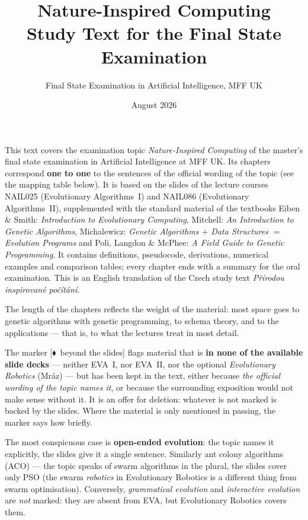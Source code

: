 \documentclass[11pt,a4paper]{article}
\title{\textbf{Nature-Inspired Computing}\\[2mm]
\large Study Text for the Final State Examination}
\author{Final State Examination in Artificial Intelligence, MFF UK}
\date{August 2026}
\theoremstyle{definition}
\newcommand{\mimo}{\textcolor{markcol}{\textsf{\footnotesize[$\blacklozenge$~beyond the slides]}}}
\begin{document}
\maketitle

\begin{center}
\begin{minipage}{0.92\textwidth}
\small
This text covers the examination topic \emph{Nature-Inspired Computing} of the master's final
state examination in Artificial Intelligence at MFF UK. Its chapters correspond
\textbf{one to one} to the sentences of the official wording of the topic (see the mapping
table below). It is based on the slides of the lecture courses NAIL025 (Evolutionary
Algorithms~I) and NAIL086 (Evolutionary Algorithms~II), supplemented with the standard
material of the textbooks Eiben \& Smith: \emph{Introduction to Evolutionary Computing},
Mitchell: \emph{An Introduction to Genetic Algorithms}, Michalewicz: \emph{Genetic Algorithms
$+$ Data Structures $=$ Evolution Programs} and Poli, Langdon \& McPhee: \emph{A Field Guide
to Genetic Programming}. It contains definitions, pseudocode, derivations, numerical examples
and comparison tables; every chapter ends with a summary for the oral examination.
This is an English translation of the Czech study text \emph{Přírodou inspirované počítání}.
\end{minipage}
\end{center}

\begin{center}
\begin{minipage}{0.92\textwidth}
\begin{poznbox}
\small
The length of the chapters reflects the weight of the material: most space goes to genetic
algorithms with genetic programming, to schema theory, and to the applications --- that is,
to what the lectures treat in most detail.

The marker \mimo{} flags material that is \textbf{in none of the available slide decks} ---
neither EVA~I, nor EVA~II, nor the optional \emph{Evolutionary Robotics} (Mráz) --- but has
been kept in the text, either because \emph{the official wording of the topic names it}, or
because the surrounding exposition would not make sense without it. It is an offer for
deletion: whatever is not marked is backed by the slides. Where the material is only
mentioned in passing, the marker says how briefly.

The most conspicuous case is \textbf{open-ended evolution}: the topic names it explicitly,
the slides give it a single sentence. Similarly ant colony algorithms (ACO) --- the topic
speaks of swarm algorithms in the plural, the slides cover only PSO (the swarm \emph{robotics}
in Evolutionary Robotics is a different thing from swarm optimisation). Conversely,
\emph{grammatical evolution} and \emph{interactive evolution} are \emph{not} marked: they are
absent from EVA, but Evolutionary Robotics covers them.
\end{poznbox}
\end{minipage}
\end{center}
\end{document}
